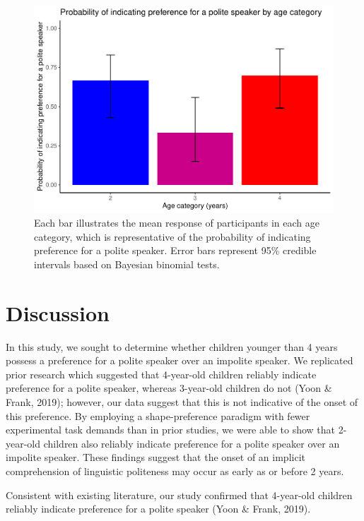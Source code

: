 \documentclass[
  english,
  man,floatsintext]{apa6}
\begin{document}
\begin{figure}
\centering
\includegraphics{writeup_files/figure-latex/unnamed-chunk-2-1.pdf}
\caption{\label{fig:unnamed-chunk-2}Each bar illustrates the mean response of participants in each age category, which is representative of the probability of indicating preference for a polite speaker. Error bars represent 95\% credible intervals based on Bayesian binomial tests.}
\end{figure}

\newpage

\hypertarget{discussion}{%
\section{Discussion}\label{discussion}}

In this study, we sought to determine whether children younger than 4 years possess a preference for a polite speaker over an impolite speaker. We replicated prior research which suggested that 4-year-old children reliably indicate preference for a polite speaker, whereas 3-year-old children do not (Yoon \& Frank, 2019); however, our data suggest that this is not indicative of the onset of this preference. By employing a shape-preference paradigm with fewer experimental task demands than in prior studies, we were able to show that 2-year-old children also reliably indicate preference for a polite speaker over an impolite speaker. These findings suggest that the onset of an implicit comprehension of linguistic politeness may occur as early as or before 2 years.

Consistent with existing literature, our study confirmed that 4-year-old children reliably indicate preference for a polite speaker (Yoon \& Frank, 2019).
\end{document}
